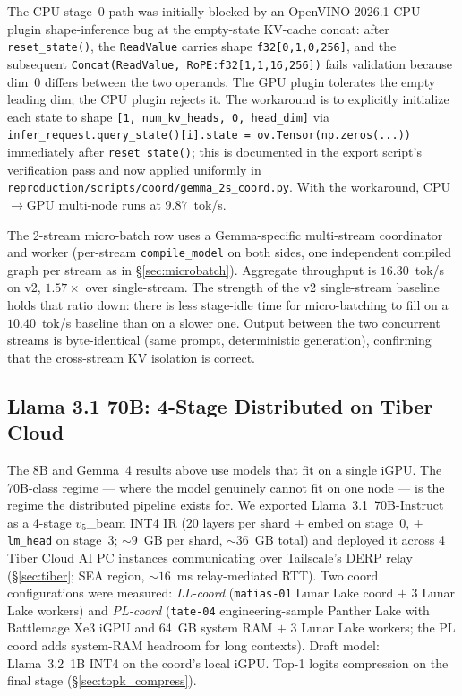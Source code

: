 \documentclass[11pt]{article}
\newcommand{\brk}{\discretionary{}{}{}}
\begin{document}
The CPU stage~0 path was initially blocked by an OpenVINO 2026.1 CPU-plugin shape-inference bug at the empty-state KV-cache concat: after \texttt{reset\_state()}, the \texttt{ReadValue} carries shape \texttt{f32[0,1,0,256]}, and the subsequent \texttt{Concat(ReadValue, RoPE:f32[1,1,16,256])} fails validation because dim~0 differs between the two operands. The GPU plugin tolerates the empty leading dim; the CPU plugin rejects it. The workaround is to explicitly initialize each state to shape \texttt{[1, num\_kv\_heads, 0, head\_dim]} via \texttt{infer\_\brk request.\brk query\_state()\brk [i].\brk state = ov.Tensor(np.zeros(...))} immediately after \texttt{reset\_state()}; this is documented in the export script's verification pass and now applied uniformly in \texttt{reproduction/\brk scripts/\brk coord/\brk gemma\_2s\_coord.py}. With the workaround, CPU$\rightarrow$GPU multi-node runs at $\mathbf{9.87}$~tok/s.

The 2-stream micro-batch row uses a Gemma-specific multi-stream coordinator and worker (per-stream \texttt{compile\_\brk model} on both sides, one independent compiled graph per stream as in \S\ref{sec:microbatch}). Aggregate throughput is $\mathbf{16.30}$~tok/s on v2, $1.57\times$ over single-stream. The strength of the v2 single-stream baseline holds that ratio down: there is less stage-idle time for micro-batching to fill on a $10.40$~tok/s baseline than on a slower one. Output between the two concurrent streams is byte-identical (same prompt, deterministic generation), confirming that the cross-stream KV isolation is correct.

\subsection{Llama 3.1 70B: 4-Stage Distributed on Tiber Cloud}
\label{sec:llama70b}

The 8B and Gemma~4 results above use models that fit on a single iGPU. The 70B-class regime --- where the model genuinely cannot fit on one node --- is the regime the distributed pipeline exists for. We exported Llama~3.1~70B-Instruct as a 4-stage $v_5$\_beam INT4 IR (20 layers per shard $+$ embed on stage~0, $+$ \texttt{lm\_head} on stage~3; $\sim 9$~GB per shard, $\sim 36$~GB total) and deployed it across 4 Tiber Cloud AI PC instances communicating over Tailscale's DERP relay (\S\ref{sec:tiber}; SEA region, $\sim 16$~ms relay-mediated RTT). Two coord configurations were measured: \emph{LL-coord} (\texttt{matias-01} Lunar Lake coord $+$ 3 Lunar Lake workers) and \emph{PL-coord} (\texttt{tate-04} engineering-sample Panther Lake with Battlemage Xe3 iGPU and 64~GB system RAM $+$ 3 Lunar Lake workers; the PL coord adds system-RAM headroom for long contexts). Draft model: Llama~3.2~1B INT4 on the coord's local iGPU. Top-1 logits compression on the final stage (\S\ref{sec:topk_compress}).
\end{document}
